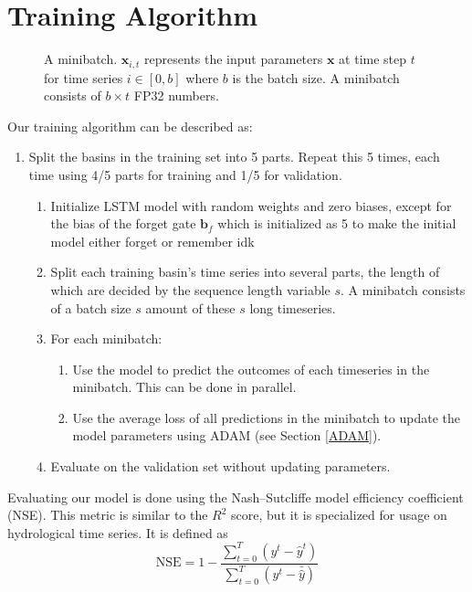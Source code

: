 \section{Training Algorithm}
\begin{figure}
\centering

\caption{A minibatch. $\bm{x}_{i,t}$ represents the input parameters $\bm{x}$ at time step $t$ for time series $i \in [0, b]$ where $b$ is the batch size. A minibatch consists of $b \times t$ FP32 numbers.}
\label{minibatch}
\end{figure}
Our training algorithm can be described as:
\begin{enumerate}
    \item Split the basins in the training set into 5 parts. Repeat this 5 times, each time using 4/5 parts for training and 1/5 for validation.\begin{enumerate}
        \item Initialize LSTM model with random weights and zero biases, except for the bias of the forget gate $\bm{b}_f$ which is initialized as 5 to make the initial model either forget or remember idk \citationneeded
        \item Split each training basin's time series into several parts, the length 
            of which are decided by the sequence length variable $s$. A minibatch 
            consists of a batch size $s$ amount of these $s$ long timeseries.
        \item For each minibatch:
        \begin{enumerate}
            \item Use the model to predict the outcomes of each timeseries in the 
                minibatch. This can be done in parallel.
            \item Use the average loss of all predictions in the minibatch to update 
                the model parameters using ADAM (see Section \ref{ADAM}).
        \end{enumerate}
        \item Evaluate on the validation set without updating parameters.
    \end{enumerate}
\end{enumerate}
Evaluating our model is done using the Nash–Sutcliffe model efficiency coefficient (NSE). \cite{NSE}
This metric is similar to the $R^2$ score, but it is specialized for usage 
on hydrological time series.
It is defined as 
\begin{equation}
    \text{NSE} = 1 - \frac{\sum_{t=0}^T\left( y^t - \hat{y}^t\right)}{\sum_{t=0}^T\left(y^t - \bar{\hat{y}}\right)} \label{NSE}
\end{equation}
